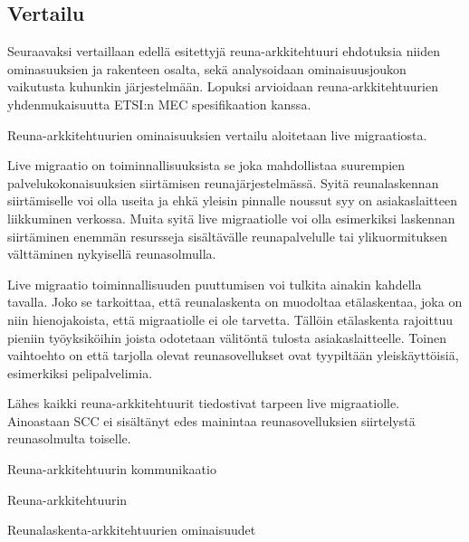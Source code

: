 \subsection{Vertailu}
Seuraavaksi vertaillaan edellä esitettyjä reuna-arkkitehtuuri ehdotuksia niiden ominasuuksien ja rakenteen osalta, sekä analysoidaan ominaisuusjoukon vaikutusta kuhunkin järjestelmään.
Lopuksi arvioidaan reuna-arkkitehtuurien yhdenmukaisuutta ETSI:n MEC spesifikaation kanssa.

Reuna-arkkitehtuurien ominaisuuksien vertailu aloitetaan live migraatiosta.
\par
Live migraatio on toiminnallisuuksista se joka mahdollistaa suurempien palvelukokonaisuuksien siirtämisen reunajärjestelmässä. Syitä reunalaskennan siirtämiselle voi olla useita ja ehkä yleisin pinnalle noussut syy on asiakaslaitteen liikkuminen verkossa. Muita syitä live migraatiolle voi olla esimerkiksi laskennan siirtäminen enemmän resursseja sisältävälle reunapalvelulle tai ylikuormituksen välttäminen nykyisellä reunasolmulla.

Live migraatio toiminnallisuuden puuttumisen voi tulkita ainakin kahdella tavalla. Joko se tarkoittaa, että reunalaskenta on muodoltaa etälaskentaa, joka on niin hienojakoista, että migraatiolle ei ole tarvetta. Tällöin etälaskenta rajoittuu pieniin työyksiköihin joista odotetaan välitöntä tulosta asiakaslaitteelle. 
Toinen vaihtoehto on että tarjolla olevat reunasovellukset ovat tyypiltään yleiskäyttöisiä, esimerkiksi pelipalvelimia.

Lähes kaikki reuna-arkkitehtuurit tiedostivat tarpeen live migraatiolle. Ainoastaan SCC ei sisältänyt edes mainintaa reunasovelluksien siirtelystä reunasolmulta toiselle.


\par
Reuna-arkkitehtuurin kommunikaatio

\par
Reuna-arkkitehtuurin 



\begin{table}
	\caption{Reunalaskenta-arkkitehtuurien ominaisuudet}
	\label{table:features}
	
\end{table}
 